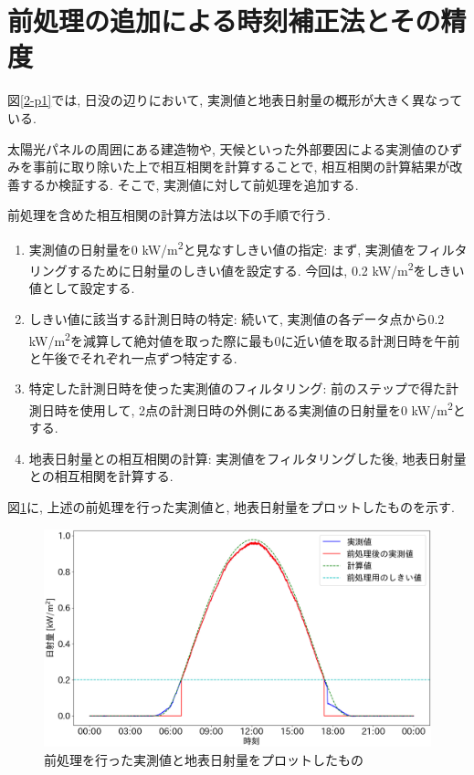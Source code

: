 \section{前処理の追加による時刻補正法とその精度}

図\ref{2-p1}では, 日没の辺りにおいて, 実測値と地表日射量の概形が大きく異なっている.

太陽光パネルの周囲にある建造物や, 天候といった外部要因による実測値のひずみを事前に取り除いた上で相互相関を計算することで, 相互相関の計算結果が改善するか検証する. そこで, 実測値に対して前処理を追加する.

前処理を含めた相互相関の計算方法は以下の手順で行う.

\begin{enumerate}
  \item 実測値の日射量を0 \si{\kilo\watt}/\si{\metre\squared}と見なすしきい値の指定: まず, 実測値をフィルタリングするために日射量のしきい値を設定する. 今回は, 0.2 \si{\kilo\watt}/\si{\metre\squared}をしきい値として設定する.
  \item しきい値に該当する計測日時の特定: 続いて, 実測値の各データ点から0.2 \si{\kilo\watt}/\si{\metre\squared}を減算して絶対値を取った際に最も0に近い値を取る計測日時を午前と午後でそれぞれ一点ずつ特定する.
  \item 特定した計測日時を使った実測値のフィルタリング: 前のステップで得た計測日時を使用して, 2点の計測日時の外側にある実測値の日射量を0 \si{\kilo\watt}/\si{\metre\squared}とする.
  \item 地表日射量との相互相関の計算: 実測値をフィルタリングした後, 地表日射量との相互相関を計算する.
\end{enumerate}

図\ref{2-p2}に, 上述の前処理を行った実測値と, 地表日射量をプロットしたものを示す.

\begin{figure}[H]
  \begin{center}
    \includegraphics[width=140mm]{sotu/figure/2/drop-under-0.2-q.png}
    \caption{前処理を行った実測値と地表日射量をプロットしたもの}
    \label{2-p2}
  \end{center}
\end{figure}

